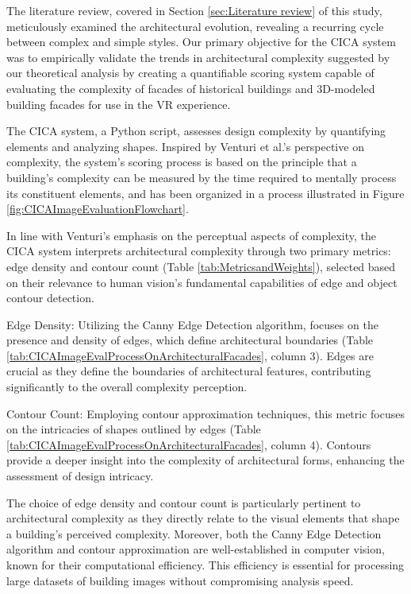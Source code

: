 The literature review, covered in Section \ref{sec:Literature review} of this study, meticulously examined the architectural evolution, revealing a recurring cycle between complex and simple styles.
Our primary objective for the CICA system was to empirically validate the trends in architectural complexity suggested by our theoretical analysis by creating a quantifiable scoring system capable of evaluating the complexity of facades of historical buildings and 3D-modeled building facades for use in the VR experience.

The CICA system, a Python script, assesses design complexity by quantifying elements and analyzing shapes.
Inspired by Venturi et al.'s perspective on complexity\cite{Venturi1977}, the system's scoring process is based on the principle that a building's complexity can be measured by the time required to mentally process its constituent elements, and has been organized in a process illustrated in Figure \ref{fig:CICAImageEvaluationFlowchart}.

In line with Venturi's emphasis on the perceptual aspects of complexity, the CICA system interprets architectural complexity through two primary metrics: edge density and contour count (Table \ref{tab:MetricsandWeights}), selected based on their relevance to human vision's fundamental capabilities of edge and object contour detection\cite{Yang2022}.

Edge Density: Utilizing the Canny Edge Detection algorithm\cite{EdgeOpenCV2023}, focuses on the presence and density of edges, which define architectural boundaries (Table \ref{tab:CICAImageEvalProcessOnArchitecturalFacades}, column 3).
Edges are crucial as they define the boundaries of architectural features, contributing significantly to the overall complexity perception.

Contour Count: Employing contour approximation techniques\cite{ContourOpenCV2023}, this metric focuses on the intricacies of shapes outlined by edges (Table \ref{tab:CICAImageEvalProcessOnArchitecturalFacades}, column 4).
Contours provide a deeper insight into the complexity of architectural forms, enhancing the assessment of design intricacy.

The choice of edge density and contour count is particularly pertinent to architectural complexity as they directly relate to the visual elements that shape a building's perceived complexity.
Moreover, both the Canny Edge Detection algorithm and contour approximation are well-established in computer vision, known for their computational efficiency\cite{Yang2022}.
This efficiency is essential for processing large datasets of building images without compromising analysis speed.

